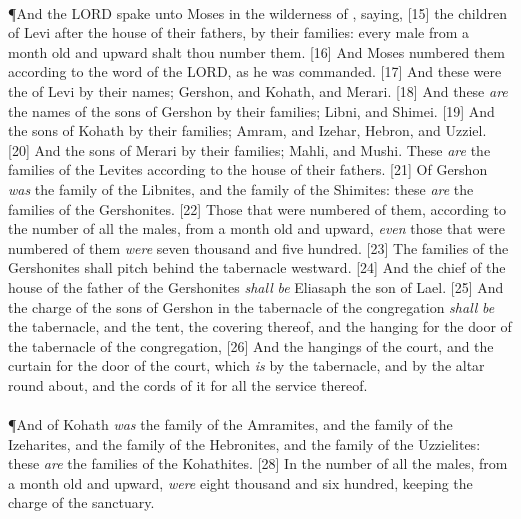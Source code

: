\\
\P \textcolor[cmyk]{0.99998,1,0,0}{And the LORD spake unto Moses in the wilderness of , saying,}
[15] \textcolor[cmyk]{0.99998,1,0,0}{ the children of Levi after the house of their fathers, by their families: every male from a month old and upward shalt thou number them.}
[16] \textcolor[cmyk]{0.99998,1,0,0}{And Moses numbered them according to the word of the LORD, as he was commanded.}
[17] \textcolor[cmyk]{0.99998,1,0,0}{And these were the  of Levi by their names; Gershon, and Kohath, and Merari.}
[18] \textcolor[cmyk]{0.99998,1,0,0}{And these \emph{are} the names of the sons of Gershon by their families; Libni, and Shimei.}
[19] \textcolor[cmyk]{0.99998,1,0,0}{And the sons of Kohath by their families; Amram, and Izehar, Hebron, and Uzziel.}
[20] \textcolor[cmyk]{0.99998,1,0,0}{And the sons of Merari by their families; Mahli, and Mushi. These \emph{are} the families of the Levites according to the house of their fathers.}
[21] \textcolor[cmyk]{0.99998,1,0,0}{Of Gershon \emph{was} the family of the Libnites, and the family of the Shimites: these \emph{are} the families of the Gershonites.}
[22] \textcolor[cmyk]{0.99998,1,0,0}{Those that were numbered of them, according to the number of all the males, from a month old and upward, \emph{even} those that were numbered of them \emph{were} seven thousand and five hundred.}
[23] \textcolor[cmyk]{0.99998,1,0,0}{The families of the Gershonites shall pitch behind the tabernacle westward.}
[24] \textcolor[cmyk]{0.99998,1,0,0}{And the chief of the house of the father of the Gershonites \emph{shall} \emph{be} Eliasaph the son of Lael.}
[25] \textcolor[cmyk]{0.99998,1,0,0}{And the charge of the sons of Gershon in the tabernacle of the congregation \emph{shall} \emph{be} the tabernacle, and the tent, the covering thereof, and the hanging for the door of the tabernacle of the congregation,}
[26] \textcolor[cmyk]{0.99998,1,0,0}{And the hangings of the court, and the curtain for the door of the court, which \emph{is} by the tabernacle, and by the altar round about, and the cords of it for all the service thereof.}\\
\\
\P \textcolor[cmyk]{0.99998,1,0,0}{And of Kohath \emph{was} the family of the Amramites, and the family of the Izeharites, and the family of the Hebronites, and the family of the Uzzielites: these \emph{are} the families of the Kohathites.}
[28] \textcolor[cmyk]{0.99998,1,0,0}{In the number of all the males, from a month old and upward, \emph{were} eight thousand and six hundred, keeping the charge of the sanctuary.}
